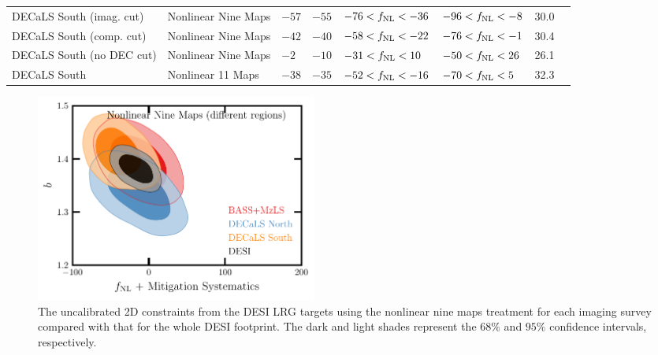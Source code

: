 \begin{table}
{\begin{tabular}{llllllll}
DECaLS South (imag. cut) & Nonlinear Nine Maps& $   -57$& $   -55$& $   -76<f_{\rm NL}<   -36$& $   -96<f_{\rm NL}<    -8$ &   30.0\\
DECaLS South (comp. cut) & Nonlinear Nine Maps& $   -42$& $   -40$& $   -58<f_{\rm NL}<   -22$& $   -76<f_{\rm NL}<    -1$ &   30.4\\
DECaLS South (no DEC cut) & Nonlinear Nine Maps& $    -2$& $   -10$& $   -31<f_{\rm NL}<    10$& $   -50<f_{\rm NL}<    26$ &   26.1\\
DECaLS South & Nonlinear 11 Maps        & $   -38$& $   -35$& $   -52<f_{\rm NL}<   -16$& $   -70<f_{\rm NL}<     5$ &   32.3\\    
   \hline
    \end{tabular}}
\end{table}


\begin{figure}
    \centering
    \includegraphics[width=0.45\textwidth]{figures/mcmc_dr9regions.pdf} 
    \caption{The uncalibrated 2D constraints from the DESI LRG targets using the nonlinear nine maps treatment for each imaging survey compared with that for the whole DESI footprint. The dark and light shades represent the $68\%$ and $95\%$ confidence intervals, respectively.}\label{fig:mcmc_dr9reg}
\end{figure}
